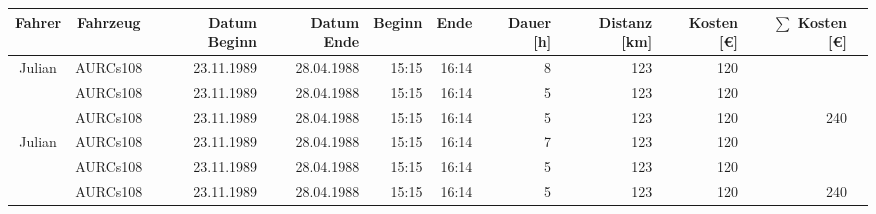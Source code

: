 \documentclass[11pt]{article}%
\begin{document}
\begin{table}
\centering

\begin{tabular}{ | c | c | r | r | r | r | r | r | r | r | r|}
\hline
Fahrer & Fahrzeug & Datum Beginn & Datum Ende & Beginn & Ende  & Dauer [h]& Distanz [km]& Kosten [\euro{}]& $\sum$ Kosten [\euro{}]\\ \hline
\multirow{2}{*}{Julian}&AURCs108&23.11.1989&28.04.1988&15:15&16:14&8&123&120&\\\cline{2-9}
&AURCs108&23.11.1989&28.04.1988&15:15&16:14&5&123&120&\\\cline{2-9}
&AURCs108&23.11.1989&28.04.1988&15:15&16:14&5&123&120&240\\\hline
\multirow{2}{*}{Julian}&AURCs108&23.11.1989&28.04.1988&15:15&16:14&7&123&120&\\\cline{2-9}
&AURCs108&23.11.1989&28.04.1988&15:15&16:14&5&123&120&\\\cline{2-9}
&AURCs108&23.11.1989&28.04.1988&15:15&16:14&5&123&120&240\\\hline
\end{tabular}
\end{table}
\end{document}
